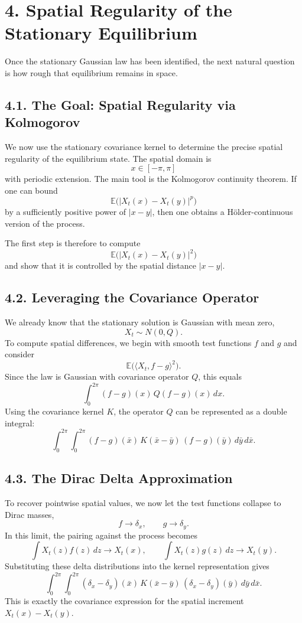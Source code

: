 \documentclass[11pt]{article}
\theoremstyle{definition}
\theoremstyle{remark}
\begin{document}
\section*{4. Spatial Regularity of the Stationary Equilibrium}
Once the stationary Gaussian law has been identified, the next natural question is how rough that equilibrium remains in space.

\subsection*{4.1. The Goal: Spatial Regularity via Kolmogorov}
We now use the stationary covariance kernel to determine the precise spatial regularity of the equilibrium state. The spatial domain is
\[
x\in[-\pi,\pi]
\]
with periodic extension. The main tool is the Kolmogorov continuity theorem. If one can bound
\[
\mathbb E\bigl(|X_t(x)-X_t(y)|^p\bigr)
\]
by a sufficiently positive power of \(|x-y|\), then one obtains a Hölder-continuous version of the process.

The first step is therefore to compute
\[
\mathbb E\bigl(|X_t(x)-X_t(y)|^2\bigr)
\]
and show that it is controlled by the spatial distance \(|x-y|\).

\subsection*{4.2. Leveraging the Covariance Operator}
We already know that the stationary solution is Gaussian with mean zero,
\[
X_t\sim N(0,Q).
\]
To compute spatial differences, we begin with smooth test functions \(f\) and \(g\) and consider
\[
\mathbb E\bigl(\langle X_t,f-g\rangle^2\bigr).
\]
Since the law is Gaussian with covariance operator \(Q\), this equals
\[
\int_0^{2\pi}(f-g)(x)\,Q(f-g)(x)\,dx.
\]
Using the covariance kernel \(K\), the operator \(Q\) can be represented as a double integral:
\[
\int_0^{2\pi}\int_0^{2\pi}
(f-g)(\bar x)\,K(\bar x-\bar y)\,(f-g)(\bar y)\,d\bar y\,d\bar x.
\]

\subsection*{4.3. The Dirac Delta Approximation}
To recover pointwise spatial values, we now let the test functions collapse to Dirac masses,
\[
f\to \delta_x,
\qquad
g\to \delta_y.
\]
In this limit, the pairing against the process becomes
\[
\int X_t(z)f(z)\,dz\to X_t(x),
\qquad
\int X_t(z)g(z)\,dz\to X_t(y).
\]
Substituting these delta distributions into the kernel representation gives
\[
\int_0^{2\pi}\int_0^{2\pi}
(\delta_x-\delta_y)(\bar x)\,K(\bar x-\bar y)\,(\delta_x-\delta_y)(\bar y)\,d\bar y\,d\bar x.
\]
This is exactly the covariance expression for the spatial increment \(X_t(x)-X_t(y)\).
\end{document}
